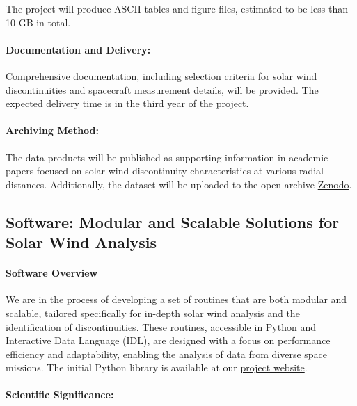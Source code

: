 \documentclass[
  letterpaper,
  DIV=11,
  numbers=noendperiod]{scrartcl}
\let\oldparagraph\paragraph
\renewcommand{\paragraph}[1]{\oldparagraph{#1}\mbox{}}
\begin{document}
The project will produce ASCII tables and figure files, estimated to be
less than 10 GB in total.

\paragraph{Documentation and
Delivery:}\label{documentation-and-delivery}

Comprehensive documentation, including selection criteria for solar wind
discontinuities and spacecraft measurement details, will be provided.
The expected delivery time is in the third year of the project.

\paragraph{Archiving Method:}\label{archiving-method}

The data products will be published as supporting information in
academic papers focused on solar wind discontinuity characteristics at
various radial distances. Additionally, the dataset will be uploaded to
the open archive \href{https://zenodo.org/}{Zenodo}.

\subsection{Software: Modular and Scalable Solutions for Solar Wind
Analysis}\label{software-modular-and-scalable-solutions-for-solar-wind-analysis}

\paragraph{Software Overview}\label{software-overview}

We are in the process of developing a set of routines that are both
modular and scalable, tailored specifically for in-depth solar wind
analysis and the identification of discontinuities. These routines,
accessible in Python and Interactive Data Language (IDL), are designed
with a focus on performance efficiency and adaptability, enabling the
analysis of data from diverse space missions. The initial Python library
is available at our \href{https://beforerr.github.io/ids_finder}{project
website}.

\paragraph{Scientific Significance:}\label{scientific-significance-1}
\end{document}
